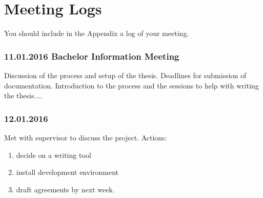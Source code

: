 \chapter{Meeting Logs}
You should include in the Appendix a log of your meeting.

\subsection*{11.01.2016 Bachelor Information Meeting}
Discussion of the process and setup of the thesis.  Deadlines for submission of documentation.  Introduction to the process and the sessions to help with writing the thesis....

\subsection*{12.01.2016}
Met with supervisor to discuss the project. Actions:
\begin{enumerate}
	\item decide on a writing tool
	\item install development environment
	\item draft agreements by next week.
\end{enumerate}



